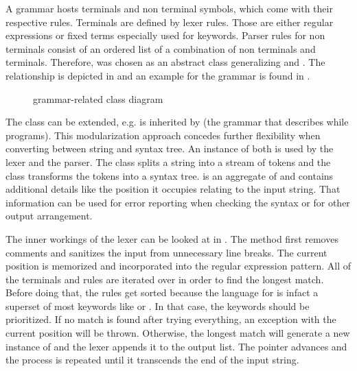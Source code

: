A grammar hosts terminals and non terminal symbols, which come with their respective rules. Terminals are defined by lexer rules. Those are either regular expressions or fixed terms especially used for keywords. Parser rules for non terminals consist of an ordered list of a combination of non terminals and terminals. Therefore,  was chosen as an abstract class generalizing  and . The relationship is depicted in  and an example for the  grammar is found in .

\begin{figure}[!h]
	\centering

	

	\caption{grammar-related class diagram}
	\label{fig:class_grammar}
\end{figure}



The  class can be extended, e.g.  is inherited by  (the grammar that describes while programs). This modularization approach concedes further flexibility when converting between string and syntax tree. An instance of  both is used by the lexer and the parser. The  class splits a string into a stream of tokens and the  class transforms the tokens into a syntax tree.  is an aggregate of  and contains additional details like the position it occupies relating to the input string. That information can be used for error reporting when checking the syntax or for other output arrangement.

The inner workings of the lexer can be looked at in . The method first removes comments and sanitizes the input from unnecessary line breaks. The current position is memorized and incorporated into the regular expression pattern. All of the terminals and rules are iterated over in order to find the longest match. Before doing that, the rules get sorted because the language for  is infact a superset of most keywords like  or . In that case, the keywords should be prioritized. If no match is found after trying everything, an exception with the current position will be thrown. Otherwise, the longest match will generate a new instance of  and the lexer appends it to the output list. The pointer advances and the process is repeated until it transcends the end of the input string.

